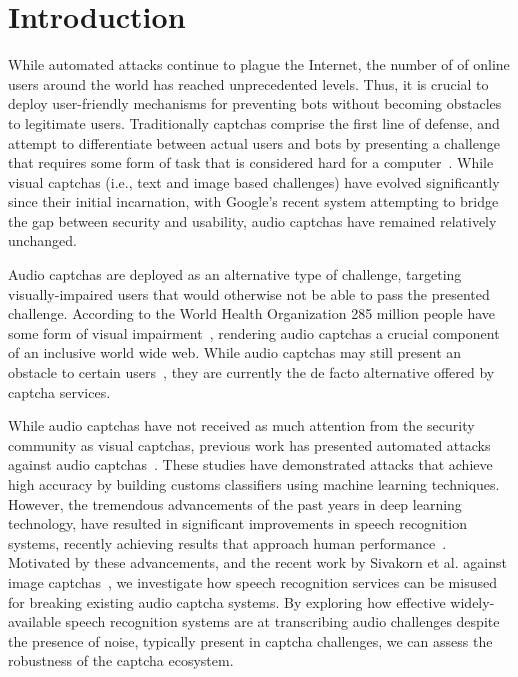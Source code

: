 \section{Introduction}
\label{sec:intro}

While automated attacks continue to plague the Internet,
the number of of online users around the world has reached unprecedented levels.
Thus, it is crucial to deploy user-friendly mechanisms for preventing bots without
becoming obstacles to legitimate users. Traditionally captchas comprise the first 
line of defense, and attempt to differentiate between actual users and bots by 
presenting a challenge that requires some form of task that is considered hard 
for a computer~\cite{captcha}. While visual captchas (i.e., text and image based challenges) 
have evolved significantly since their initial incarnation, with Google's recent \re system 
attempting to bridge the gap between security and usability, audio captchas have remained 
relatively unchanged.

Audio captchas are deployed as an alternative type of challenge, targeting
visually-impaired users that would otherwise not be able to pass the presented
challenge. According to the World Health Organization 285 million people have 
some form of visual impairment~\cite{impaired}, rendering audio captchas a
crucial component of an inclusive world wide web. While audio captchas may still present
an obstacle to certain users~\cite{sauer2008towards,bigham2008inspiring,bigham2009evaluating},
they are currently the de facto alternative offered by captcha services.

While audio captchas have not received as much attention from the security community as visual captchas,
previous work has presented automated attacks against audio captchas~\cite{Sano2013,Bursztein2009,
meutzner2014using,tam2009breaking,bursztein2011failure}. These studies have demonstrated attacks
that achieve high accuracy by building customs classifiers using machine learning techniques.
However, the tremendous advancements of the past years in deep learning technology, have
resulted in significant improvements in speech recognition systems, recently achieving
results that approach human performance~\cite{ibm_blog,saon2017english}. Motivated
by these advancements, and the recent work by Sivakorn et al. against image 
captchas~\cite{sivakorn:eurosp16}, we investigate how speech recognition services
can be misused for breaking existing audio captcha systems. By exploring how effective
widely-available speech recognition systems are at transcribing audio challenges despite 
the presence of noise, typically present in captcha challenges, we can assess the robustness 
of the captcha ecosystem.

